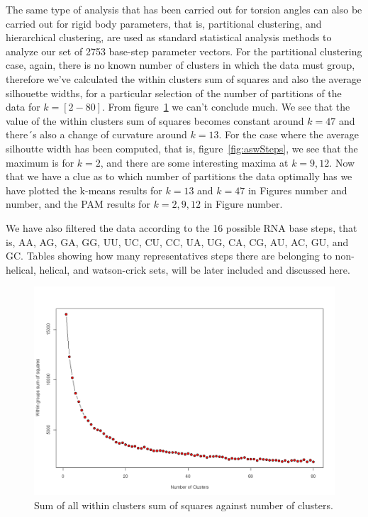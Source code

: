 The same type of analysis that has been carried out for torsion angles
can  also  be  carried  out   for  rigid  body  parameters,  that  is,
partitional  clustering, and  hierarchical  clustering, are used  as 
standard statistical  analysis methods  to analyze  our set  of  2753 
base-step parameter vectors.  For the  partitional clustering case, 
again, there is no known number of clusters in which the data must
group, therefore we've  calculated the  within clusters  sum  of
squares and also  the
average silhouette widths, for a particular selection of the number of
partitions of the data for $k=[2-80]$.  From figure~\ref{fig:wssSteps}
we can't conclude  much. We see that the value  of the within clusters
sum  of squares  becomes constant  around  $k=47$ and  there´s also  a
change of  curvature around  $k=13$.  For the  case where  the average
silhoutte width has been computed, that is, figure~\ref{fig:aswSteps},
we see that  the maximum is for $k=2$, and  there are some interesting
maxima at  $k=9,12$.  Now that  we have a  clue as to which  number of
partitions the data  optimally has we have plotted  the k-means results
for $k=13$ and $k=47$ in Figures  number and number, and the PAM results for
$k=2, 9, 12$ in Figure number.

We have  also filtered  the data according  to the 16  possible RNA
base steps, that is,  AA, AG, GA, GG, UU, UC, CU,  CC, UA, UG, CA, CG,
AU, AC,  GU, and  GC.  Tables showing  how many  representatives steps
there are  belonging to  non-helical, helical, and  watson-crick sets,
will be later included and discussed here.

\begin{figure}[htbp]
\centering
\includegraphics[angle=0, scale=0.40]{hartigan_nuclu_steps_b.png}
\caption{Sum of all within clusters sum of squares against number of clusters.}
\label{fig:wssSteps}
\end{figure}

